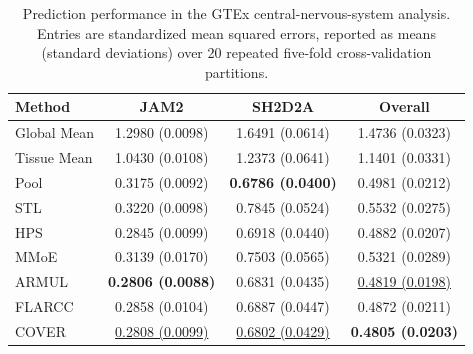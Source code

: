 \begin{table}[t]
\centering
\small
\begin{tabular}{lccc}
\toprule
Method & JAM2 & SH2D2A & Overall \\
\midrule
Global Mean & 1.2980 (0.0098) & 1.6491 (0.0614) & 1.4736 (0.0323) \\
Tissue Mean & 1.0430 (0.0108) & 1.2373 (0.0641) & 1.1401 (0.0331) \\
\midrule
Pool & 0.3175 (0.0092) & \textbf{0.6786 (0.0400)} & 0.4981 (0.0212) \\
STL & 0.3220 (0.0098) & 0.7845 (0.0524) & 0.5532 (0.0275) \\
HPS & 0.2845 (0.0099) & 0.6918 (0.0440) & 0.4882 (0.0207) \\
MMoE & 0.3139 (0.0170) & 0.7503 (0.0565) & 0.5321 (0.0289) \\
ARMUL & \textbf{0.2806 (0.0088)} & 0.6831 (0.0435) & \underline{0.4819 (0.0198)} \\
FLARCC & 0.2858 (0.0104) & 0.6887 (0.0447) & 0.4872 (0.0211) \\
COVER & \underline{0.2808 (0.0099)} & \underline{0.6802 (0.0429)} & \textbf{0.4805 (0.0203)} \\
\bottomrule
\end{tabular}
\caption{Prediction performance in the GTEx central-nervous-system analysis. Entries are standardized mean squared errors, reported as means (standard deviations) over 20 repeated five-fold cross-validation partitions.}
\label{tab:gtex-main}
\end{table}
